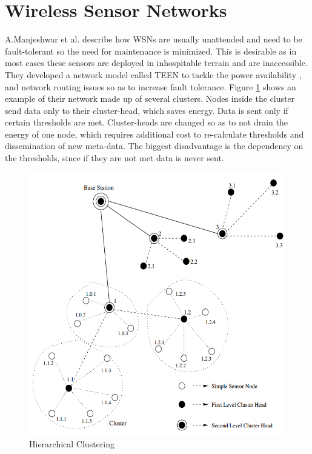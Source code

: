 \documentclass{mproj}
\begin{document}
\section{Wireless Sensor Networks}
A.Manjeshwar et al. \cite{teen} describe how WSNs are usually unattended and need to be fault-tolerant so the need for maintenance is minimized. This is desirable as in most cases these sensors are deployed in inhospitable terrain and are inaccessible. They developed a network model called TEEN to tackle the power availability , and network routing issues so as to increase fault tolerance. Figure \ref{fig:teen} shows an example of their network made up of several clusters. Nodes inside the cluster send data only to their cluster-head, which saves energy. Data is sent only if certain thresholds are met. Cluster-heads are changed so as to not drain the energy of one node, which requires additional cost to re-calculate thresholds and dissemination of new meta-data. The biggest disadvantage is the dependency on the thresholds, since if they are not met data is never sent.

\begin{figure}[H]
\caption{Hierarchical Clustering \cite{teen}}
\label{fig:teen}
\centerline{\includegraphics[scale=0.5]{teen}}
\end{figure}
\end{document}
